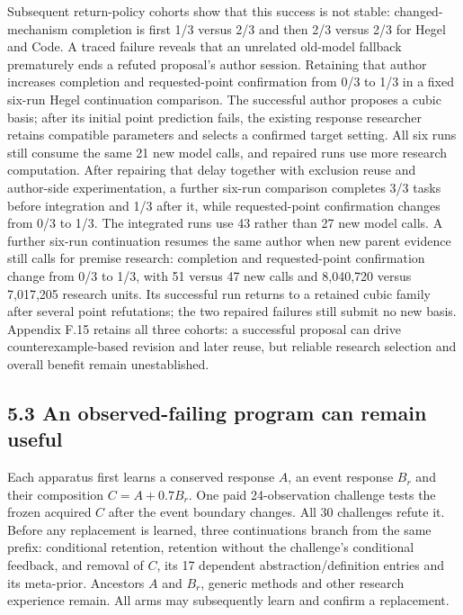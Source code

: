 \documentclass[11pt,a4paper]{article}
\begin{document}
Subsequent return-policy cohorts show that this success is not stable: changed-mechanism completion is first 1/3 versus 2/3 and then 2/3 versus 2/3 for Hegel and Code. A traced failure reveals that an unrelated old-model fallback prematurely ends a refuted proposal's author session. Retaining that author increases completion and requested-point confirmation from 0/3 to 1/3 in a fixed six-run Hegel continuation comparison. The successful author proposes a cubic basis; after its initial point prediction fails, the existing response researcher retains compatible parameters and selects a confirmed target setting. All six runs still consume the same 21 new model calls, and repaired runs use more research computation. After repairing that delay together with exclusion reuse and author-side experimentation, a further six-run comparison completes 3/3 tasks before integration and 1/3 after it, while requested-point confirmation changes from 0/3 to 1/3. The integrated runs use 43 rather than 27 new model calls. A further six-run continuation resumes the same author when new parent evidence still calls for premise research: completion and requested-point confirmation change from 0/3 to 1/3, with 51 versus 47 new calls and 8,040,720 versus 7,017,205 research units. Its successful run returns to a retained cubic family after several point refutations; the two repaired failures still submit no new basis. Appendix F.15 retains all three cohorts: a successful proposal can drive counterexample-based revision and later reuse, but reliable research selection and overall benefit remain unestablished.


\subsection*{5.3 An observed-failing program can remain useful}

Each apparatus first learns a conserved response \(A\), an event response \(B_r\) and their composition \(C=A+0.7B_r\). One paid 24-observation challenge tests the frozen acquired \(C\) after the event boundary changes. All 30 challenges refute it. Before any replacement is learned, three continuations branch from the same prefix: conditional retention, retention without the challenge's conditional feedback, and removal of \(C\), its 17 dependent abstraction/definition entries and its meta-prior. Ancestors \(A\) and \(B_r\), generic methods and other research experience remain. All arms may subsequently learn and confirm a replacement.
\end{document}
